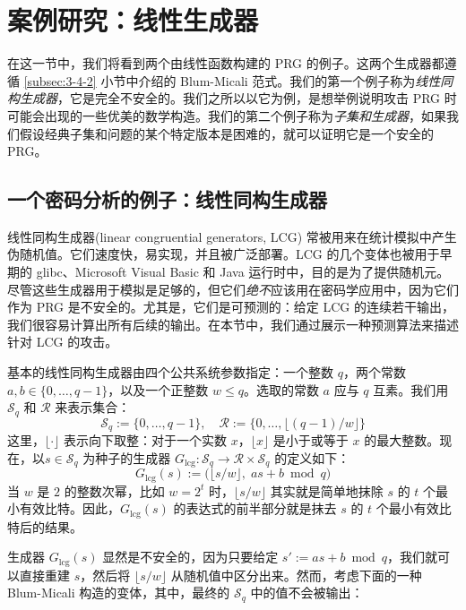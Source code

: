 \section{案例研究：线性生成器}\label{sec:3-7}

在这一节中，我们将看到两个由线性函数构建的 PRG 的例子。这两个生成器都遵循 \ref{subsec:3-4-2} 小节中介绍的 Blum-Micali 范式。我们的第一个例子称为\emph{线性同构生成器}，它是完全不安全的。我们之所以以它为例，是想举例说明攻击 PRG 时可能会出现的一些优美的数学构造。我们的第二个例子称为\emph{子集和生成器}，如果我们假设经典子集和问题的某个特定版本是困难的，就可以证明它是一个安全的 PRG。

\subsection{一个密码分析的例子：线性同构生成器}\label{subsec:3-7-1}

线性同构生成器(linear congruential generators, LCG) 常被用来在统计模拟中产生伪随机值。它们速度快，易实现，并且被广泛部署。LCG 的几个变体也被用于早期的 glibc、Microsoft Visual Basic 和 Java 运行时中，目的是为了提供随机元。尽管这些生成器用于模拟是足够的，但它们\emph{绝不}应该用在密码学应用中，因为它们作为 PRG 是不安全的。尤其是，它们是可预测的：给定 LCG 的连续若干输出，我们很容易计算出所有后续的输出。在本节中，我们通过展示一种预测算法来描述针对 LCG 的攻击。

基本的线性同构生成器由四个公共系统参数指定：一个整数 $q$，两个常数 $a,b\in\{0,\dots,q-1\}$，以及一个正整数 $w\leq q$。选取的常数 $a$ 应与 $q$ 互素。我们用 $\mathcal{S}_q$ 和 $\mathcal{R}$ 来表示集合：
\[
\mathcal{S}_q:=\{0,\dots,q-1\},
\quad
\mathcal{R}:=\{0,\dots,\lfloor(q-1)/w\rfloor\}
\]
这里，$\lfloor\cdot\rfloor$ 表示向下取整：对于一个实数 $x$，$\lfloor x\rfloor$ 是小于或等于 $x$ 的最大整数。现在，以$s\in\mathcal{S}_q$ 为种子的生成器 $G_\mathrm{lcg}:\mathcal{S}_q\to\mathcal{R}\times\mathcal{S}_q$ 的定义如下：
\[
G_\mathrm{lcg}(s)
:=
\big(
\lfloor s/w \rfloor,\;
as+b\bmod q
\big)
\]
当 $w$ 是 $2$ 的整数次幂，比如 $w=2^t$ 时，$\lfloor s/w \rfloor$ 其实就是简单地抹除 $s$ 的 $t$ 个最小有效比特。因此，$G_\mathrm{lcg}(s)$ 的表达式的前半部分就是抹去 $s$ 的 $t$ 个最小有效比特后的结果。

生成器 $G_\mathrm{lcg}(s)$ 显然是不安全的，因为只要给定 $s':=as+b\bmod q$，我们就可以直接重建 $s$，然后将 $\lfloor s/w \rfloor$ 从随机值中区分出来。然而，考虑下面的一种 Blum-Micali 构造的变体，其中，最终的 $\mathcal{S}_q$ 中的值不会被输出：

\vspace*{10pt}

